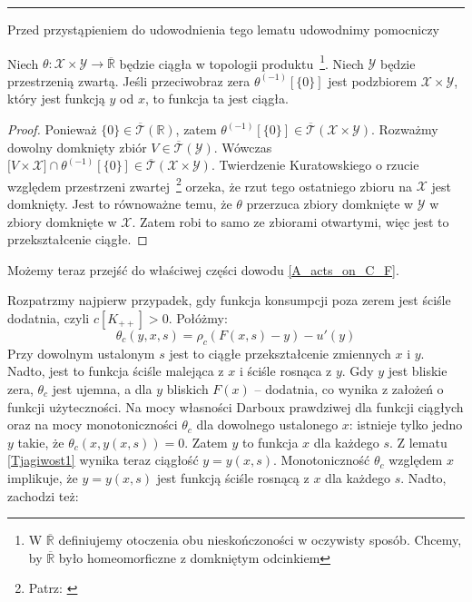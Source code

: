 \hrule
\begin{dowod}\label{A_acts_on_C_F}
\end{dowod}


Przed przystąpieniem do udowodnienia tego lematu udowodnimy pomocniczy

\begin{lemat}\label{Tjagiwost1}
	Niech $\theta: \mathcal{X} \times \mathcal{Y} \rightarrow \overline{\mathbb{R}}$ będzie ciągła w topologii produktu~\footnote{W $ \overline{\mathbb{R}} $ definiujemy otoczenia obu nieskończoności w oczywisty sposób. Chcemy, by $ \overline{\mathbb{R}} $ było homeomorficzne z domkniętym odcinkiem}. Niech $ \mathcal{Y} $ będzie przestrzenią zwartą. Jeśli przeciwobraz zera $ \theta^{(-1)}[\{ 0 \}] $ jest podzbiorem $\mathcal{X} \times \mathcal{Y}$, który jest funkcją $ y $ od $ x $, to funkcja ta jest ciągła.
\end{lemat}
\begin{proof}
	Ponieważ $ \{0\} \in \overline{\mathcal{T}}(\mathbb{R})$, zatem $ \theta^{(-1)}[\{ 0 \}] \in \overline{\mathcal{T}}(\mathcal{X} \times \mathcal{Y})$. 
Rozważmy dowolny domknięty zbiór $ V \in \overline{\mathcal{T}}(\mathcal{Y})$. Wówczas $ \bigl[ V \times \mathcal{X}\bigl] \cap  \theta^{(-1)}[\{ 0 \}] \in \overline{\mathcal{T}}(\mathcal{X} \times \mathcal{Y}) $. Twierdzenie Kuratowskiego o rzucie względem przestrzeni zwartej~\footnote{Patrz:  \citet[][str. 152-153]{Engelking}} orzeka, że rzut tego ostatniego zbioru na $ \mathcal{X} $ jest domknięty. Jest to równoważne temu, że $ \theta $ przerzuca zbiory domknięte w $ \mathcal{Y} $ w zbiory domknięte w $ \mathcal{X} $. Zatem robi to samo ze zbiorami otwartymi, więc jest to przekształcenie ciągłe. 
\end{proof}

Możemy teraz przejść do właściwej części dowodu \ref{A_acts_on_C_F}.

Rozpatrzmy najpierw przypadek, gdy funkcja konsumpcji poza zerem jest ściśle dodatnia, czyli $ c[K_{++}] >0 $. Połóżmy:
$$ \theta_c (y,x,s) =  \rho_c (F(x,s) - y) - u'(y)$$
Przy dowolnym ustalonym $ s $ jest to ciągłe przekształcenie zmiennych $ x $ i $ y $. Nadto, jest to funkcja ściśle malejąca z $ x $ i ściśle rosnąca z $ y $. Gdy $ y $ jest bliskie zera, $ \theta_c $ jest ujemna, a dla $ y $ bliskich $ F(x) $ -- dodatnia, co wynika z założeń o funkcji użyteczności. Na mocy własności Darboux prawdziwej dla funkcji ciągłych oraz na mocy monotoniczności $ \theta_c $ dla dowolnego ustalonego $ x $: istnieje tylko jedno $ y $ takie, że $ \theta_c (x, y(x,s)) = 0$. Zatem $ y $ to funkcja $ x $ dla każdego $s$. Z lematu \ref{Tjagiwost1} wynika teraz ciągłość $ y = y(x,s) $. Monotoniczność $ \theta_c $ względem $ x $ implikuje, że $ y = y(x,s) $ jest funkcją ściśle rosnącą z $ x $ dla każdego $ s $. Nadto, zachodzi też:


